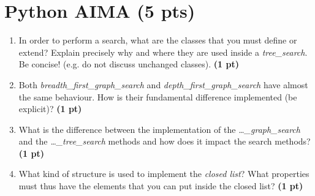 \documentclass[11pt,a4paper]{report}
\begin{document}
\maketitle

\section{Python AIMA (5 pts)}

\begin{enumerate}
  \item In order to perform a search, what are the classes that you must define or extend? Explain precisely why and where they are used inside a \textit{tree\_search}. Be concise! (e.g. do not discuss unchanged classes). \textbf{(1 pt)}
\end{enumerate}

\begin{answer}
\end{answer}



\begin{enumerate}
\setcounter{enumi}{1}
    \item Both \textit{breadth\_first\_graph\_search} and \textit{depth\_first\_graph\_search} have almost the same behaviour. How is their fundamental difference implemented (be explicit)? \textbf{(1 pt)}
\end{enumerate}

\begin{answer}
\end{answer}



\begin{enumerate}
\setcounter{enumi}{2}
    \item What is the difference between the implementation of the \textit{\dots\_graph\_search} and the \textit{\dots\_tree\_search} methods and how does it impact the search methods? \textbf{(1 pt)}
\end{enumerate}

\begin{answer}
\end{answer}



\begin{enumerate}
\setcounter{enumi}{3}
    \item What kind of structure is used to implement the \textit{closed list}? 
    What properties must thus have the elements that you can
    put inside the closed list? \textbf{(1 pt)}
\end{enumerate}
\end{document}
